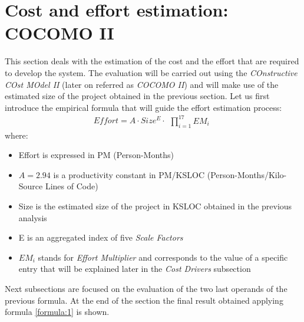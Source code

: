 \documentclass[11pt,a4paper]{report}
\begin{document}
\section{Cost and effort estimation: COCOMO II}
This section deals with the estimation of the cost and the effort that are required to develop the system. The evaluation will be carried out using the \textit{COnstructive COst MOdel II} (later on referred as \textit{COCOMO II}) and will make use of the estimated size of the project obtained in the previous section. Let us first introduce the empirical formula that will guide the effort estimation process:
\begin{equation} \label{formula:1}
Effort = A \cdot Size^E \cdot \begin{matrix} \prod_{i=1}^{17} EM_i \end{matrix}
\end{equation}
\noindent where:
\begin{itemize}
	\item Effort is expressed in PM (Person-Months)
	\item $A = 2.94$ is a productivity constant in PM/KSLOC (Person-Months/Kilo-Source Lines of Code)
	\item Size is the estimated size of the project in KSLOC obtained in the previous analysis
	\item E is an aggregated index of five \textit{Scale Factors}
	\item $EM_{i}$ stands for \textit{Effort Multiplier} and corresponds to the value of a specific entry that will be explained later in the \textit{Cost Drivers} subsection
\end{itemize}
Next subsections are focused on the evaluation of the two last operands of the previous formula. At the end of the section the final result obtained applying formula \ref{formula:1} is shown.
\end{document}
